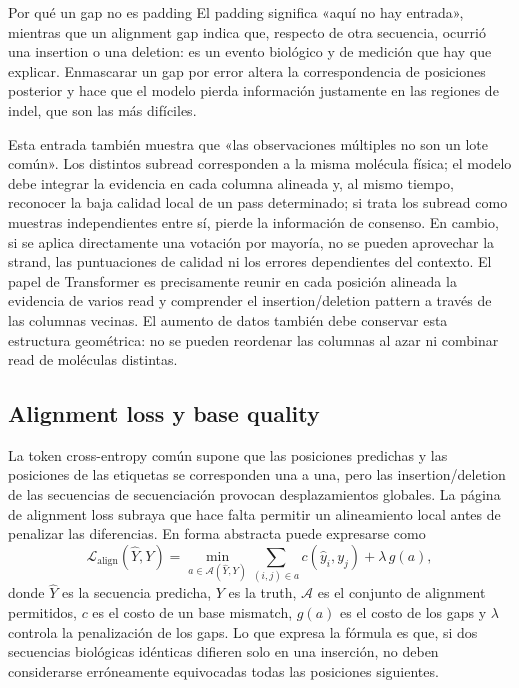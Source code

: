 \begin{warningbox}{Por qué un gap no es padding}
El padding significa «aquí no hay entrada», mientras que un alignment gap indica que, respecto de otra secuencia, ocurrió una insertion o una deletion: es un evento biológico y de medición que hay que explicar. Enmascarar un gap por error altera la correspondencia de posiciones posterior y hace que el modelo pierda información justamente en las regiones de indel, que son las más difíciles.
\end{warningbox}

Esta entrada también muestra que «las observaciones múltiples no son un lote común». Los distintos subread corresponden a la misma molécula física; el modelo debe integrar la evidencia en cada columna alineada y, al mismo tiempo, reconocer la baja calidad local de un pass determinado; si trata los subread como muestras independientes entre sí, pierde la información de consenso. En cambio, si se aplica directamente una votación por mayoría, no se pueden aprovechar la strand, las puntuaciones de calidad ni los errores dependientes del contexto. El papel de Transformer es precisamente reunir en cada posición alineada la evidencia de varios read y comprender el insertion/deletion pattern a través de las columnas vecinas. El aumento de datos también debe conservar esta estructura geométrica: no se pueden reordenar las columnas al azar ni combinar read de moléculas distintas.

\subsection{Alignment loss y base quality}

La token cross-entropy común supone que las posiciones predichas y las posiciones de las etiquetas se corresponden una a una, pero las insertion/deletion de las secuencias de secuenciación provocan desplazamientos globales. La página de alignment loss subraya que hace falta permitir un alineamiento local antes de penalizar las diferencias. En forma abstracta puede expresarse como
$$
\mathcal{L}_{\text{align}}(\hat Y,Y)=
\min_{a\in\mathcal{A}(\hat Y,Y)}
\sum_{(i,j)\in a} c(\hat y_i,y_j)+\lambda\,g(a),
$$
donde $\hat Y$ es la secuencia predicha, $Y$ es la truth, $\mathcal{A}$ es el conjunto de alignment permitidos, $c$ es el costo de un base mismatch, $g(a)$ es el costo de los gaps y $\lambda$ controla la penalización de los gaps. Lo que expresa la fórmula es que, si dos secuencias biológicas idénticas difieren solo en una inserción, no deben considerarse erróneamente equivocadas todas las posiciones siguientes.

